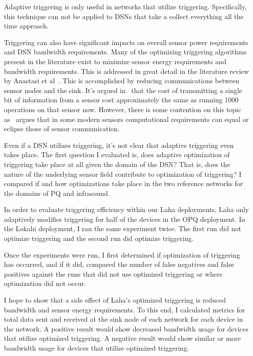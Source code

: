 Adaptive triggering is only useful in networks that utilize triggering. Specifically, this technique can not be applied to DSNs that take a collect everything all the time approach.

Triggering can also have significant impacts on overall sensor power requirements and DSN bandwidth requirements. Many of the optimizing triggering algorithms present in the literature exist to minimize sensor energy requirements and bandwidth requirements. This is addressed in great detail in the literature review by Anastasi et al~\cite{anastasi_energy_2009}. This is accomplished by reducing communications between sensor nodes and the sink. It's argued in~\cite{pottie2000wireless} that the cost of transmitting a single bit of information from a sensor cost approximately the same as running 1000 operations on that sensor now. However, there is some contention on this topic as~\cite{alippi_adaptive_2010} argues that in some modern sensors computational requirements can equal or eclipse those of  sensor communication.

Even if a DSN utilizes triggering, it's not clear that adaptive triggering even takes place. The first question I evaluated is, does adaptive optimization of triggering take place at all given the domain of the DSN? That is, does the nature of the underlying sensor field contribute to optimization of triggering? I compared if and how optimizations take place in the two reference networks for the domains of PQ and infrasound.

In order to evaluate triggering efficiency within our Laha deployments, Laha only adaptively modifies triggering for half of the devices in the OPQ deployment. In the Lokahi deployment, I  ran the same experiment twice. The first run did not optimize triggering and the second run did optimize triggering.

Once the experiments were run, I first determined if optimization of triggering has occurred, and if it did, compared the number of false negatives and false positives against the runs that did not use optimized triggering or where optimization did not occur.

I hope to show that a side effect of Laha's optimized triggering is reduced bandwidth and sensor energy requirements. To this end, I calculated metrics for total data sent and received at the sink node of each network for each device in the network. A positive result would show decreased bandwidth usage for devices that utilize optimized triggering. A negative result would show similar or more bandwidth usage for devices that utilize optimized triggering.

